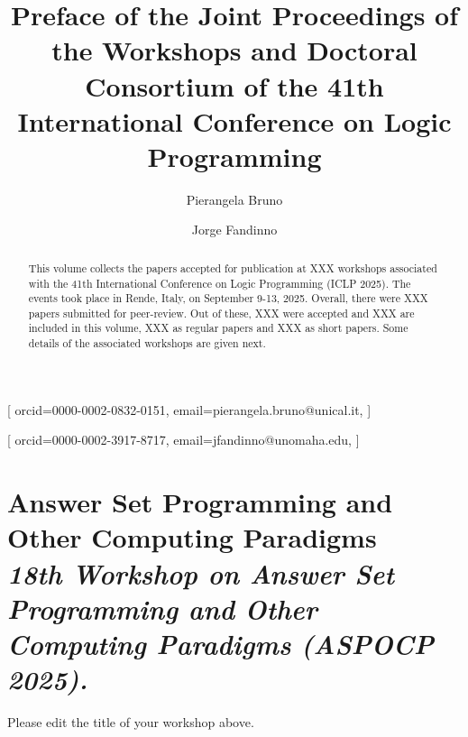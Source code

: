 \documentclass[
]{ceurart}
\begin{document}


\title{Preface of the Joint Proceedings of the Workshops and Doctoral Consortium of the 41th International Conference on Logic Programming}


\author[1]{Pierangela Bruno}[%
orcid=0000-0002-0832-0151,
email=pierangela.bruno@unical.it,
]
\address[2]{University of Calabria, Italy}


\author[2]{Jorge Fandinno}[%
orcid=0000-0002-3917-8717,
email=jfandinno@unomaha.edu,
]
\address[2]{University of Nebraska Omaha, USA}




\begin{abstract}
This volume collects the papers accepted for publication at XXX workshops associated with the 41th International Conference on Logic Programming (ICLP 2025).
%
The events took place in Rende, Italy, on September 9-13, 2025.
%
Overall, there were XXX papers submitted for peer-review.
%
Out of these, XXX were accepted and XXX are included in this volume, XXX as regular papers and XXX as short papers. Some details of the associated workshops are given next.
\end{abstract}

\maketitle

\section{Answer Set Programming and Other Computing Paradigms
\\
\rm\normalsize\it 18th Workshop on Answer Set Programming and Other Computing Paradigms (ASPOCP 2025).
}

Please edit the title of your workshop above.
\end{document}
